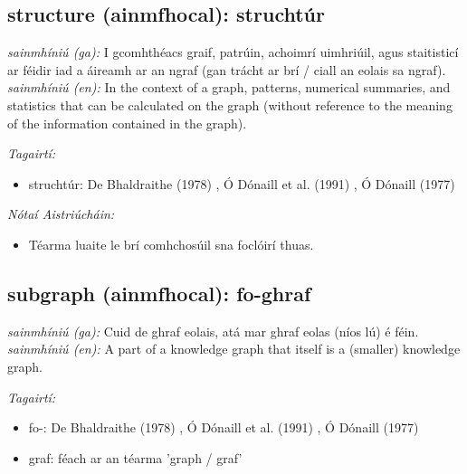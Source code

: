 \documentclass{article}
\begin{document}
\subsection*{structure (ainmfhocal): struchtúr} 
 \noindent \textit{sainmhíniú (ga):} I gcomhthéacs graif, patrúin, achoimrí uimhriúil, agus staitisticí ar féidir iad a áireamh ar an ngraf (gan trácht ar brí / ciall an eolais sa ngraf).
\newline\newline
 \noindent \textit{sainmhíniú (en):} In the context of a graph, patterns, numerical summaries, and statistics that can be calculated on the graph (without reference to the meaning of the information contained in the graph).
\newline

 \noindent \textit{Tagairtí:}
\begin{itemize}
	\item struchtúr: De Bhaldraithe (1978) \cite{de-bhaldraithe}, Ó Dónaill et al. (1991) \cite{focloir-beag}, Ó Dónaill (1977) \cite{odonaill}
\end{itemize}

 \noindent \textit{Nótaí Aistriúcháin:}
\begin{itemize}
	\item Téarma luaite le brí comhchosúil sna foclóirí thuas.
\end{itemize}


\subsection*{subgraph (ainmfhocal): fo-ghraf} 
 \noindent \textit{sainmhíniú (ga):} Cuid de ghraf eolais, atá mar ghraf eolas (níos lú) é féin.
\newline\newline
 \noindent \textit{sainmhíniú (en):} A part of a knowledge graph that itself is a (smaller) knowledge graph.
\newline

 \noindent \textit{Tagairtí:}
\begin{itemize}
	\item fo-: De Bhaldraithe (1978) \cite{de-bhaldraithe}, Ó Dónaill et al. (1991) \cite{focloir-beag}, Ó Dónaill (1977) \cite{odonaill}
	\item graf: féach ar an téarma 'graph / graf'
\end{itemize}
\end{document}
